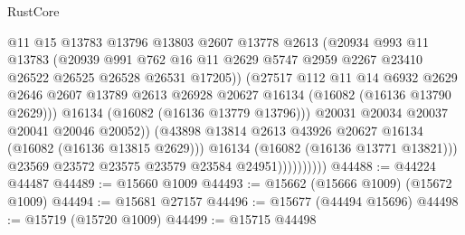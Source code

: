 \begin{lexlean}{RustCore}
\begin{coremodule}
                                @11
                                @15
                                @13783
                                @13796
                                @13803
                                @2607
                                @13778
                                @2613
                                (@20934
                                  @993
                                  @11
                                  @13783
                                  (@20939
                                    @991
                                    @762
                                    @16
                                    @11
                                    @2629
                                    @5747
                                    @2959
                                    @2267
                                    @23410
                                    @26522
                                    @26525
                                    @26528
                                    @26531
                                    @17205))
                                (@27517
                                  @112
                                  @11
                                  @14
                                  @6932
                                  @2629
                                  @2646
                                  @2607
                                  @13789
                                  @2613
                                  @26928
                                  @20627
                                  @16134
                                  (@16082 (@16136 @13790 @2629)))
                                @16134
                                (@16082 (@16136 @13779 @13796)))
                              @20031
                              @20034
                              @20037
                              @20041
                              @20046
                              @20052))
                          (@43898 @13814 @2613 @43926 @20627 @16134 (@16082 (@16136 @13815 @2629)))
                          @16134
                          (@16082 (@16136 @13771 @13821)))
                        @23569
                        @23572
                        @23575
                        @23579
                        @23584
                        @24951))))))))))
@44488 := @44224 @44487
@44489 := @15660 @1009
@44493 := @15662 (@15666 @1009) (@15672 @1009)
@44494 := @15681 @27157
@44496 := @15677 (@44494 @15696)
@44498 := @15719 (@15720 @1009)
@44499 := @15715 @44498

\end{coremodule}
\end{lexlean}

